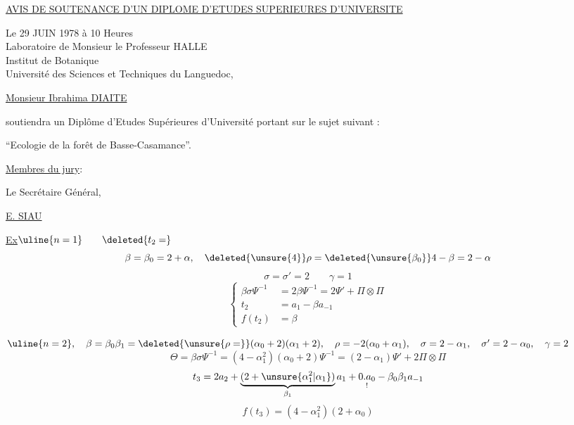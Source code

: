 \begin{center}
\uline{AVIS DE SOUTENANCE D'UN DIPLOME D'ETUDES SUPERIEURES D'UNIVERSITE}
\end{center}

Le 29 JUIN 1978 à 10 Heures\\
Laboratoire de Monsieur le Professeur HALLE\\
Institut de Botanique\\
Université des Sciences et Techniques du Languedoc,

\uline{Monsieur Ibrahima DIAITE}

soutiendra un Diplôme d'Etudes Supérieures d'Université portant sur le
sujet suivant :

``Ecologie de la forêt de Basse-Casamance''.

\uline{Membres du jury}:


Le Secrétaire Général,


\uline{E. SIAU}

\uline{Ex}\qquad\(\uline{n=1}\qquad\deleted{t_2=}\)
\[
\beta=\beta_0=2+\alpha,\quad\deleted{\unsure{4}}
\rho=\deleted{\unsure{\beta_0}}4-\beta=2-\alpha
\]
\[
\sigma=\sigma'=2\qquad\gamma=1
\]
\[
\left\{\begin{aligned}
\beta\sigma\Psi^{-1}&=2\beta\Psi^{-1}=2\Psi'+\Pi\otimes\Pi\\
t_2&=a_1-\beta a_{-1}\\
f(t_2)&=\beta
\end{aligned}\right.
\]

\(\uline{n=2},\quad
\beta=\beta_0\beta_1=\deleted{\unsure{\rho=}}(\alpha_0+2)(\alpha_1+2),\quad
\rho=-2(\alpha_0+\alpha_1),\quad
\sigma=2-\alpha_1,\quad\sigma'=2-\alpha_0,\quad\gamma=2\)
\[
\Theta=\beta\sigma\Psi^{-1}
=(4-\alpha_1^2)(\alpha_0+2)\Psi^{-1}
=(2-\alpha_1)\Psi'+2\Pi\otimes\Pi
\]
\[
t_3=2a_2+\underbrace{(2+\unsure{\alpha_1^2|\alpha_1})}_{\beta_1}a_1
+\underset{!}{0.a_0}-\beta_0\beta_1a_{-1}
\]
\[
f(t_3)=(4-\alpha_1^2)(2+\alpha_0)
\]

